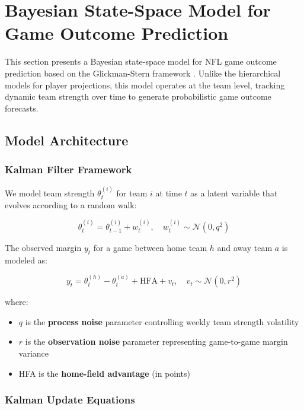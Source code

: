 \section{Bayesian State-Space Model for Game Outcome Prediction}
\label{sec:state-space-model}

This section presents a Bayesian state-space model for NFL game outcome prediction based on the Glickman-Stern framework \citep{glickman1998state}. Unlike the hierarchical models for player projections, this model operates at the team level, tracking dynamic team strength over time to generate probabilistic game outcome forecasts.

\subsection{Model Architecture}

\subsubsection{Kalman Filter Framework}

We model team strength $\theta_t^{(i)}$ for team $i$ at time $t$ as a latent variable that evolves according to a random walk:

\begin{equation}
\theta_t^{(i)} = \theta_{t-1}^{(i)} + w_t^{(i)}, \quad w_t^{(i)} \sim \mathcal{N}(0, q^2)
\label{eq:state-evolution}
\end{equation}

The observed margin $y_t$ for a game between home team $h$ and away team $a$ is modeled as:

\begin{equation}
y_t = \theta_t^{(h)} - \theta_t^{(a)} + \text{HFA} + v_t, \quad v_t \sim \mathcal{N}(0, r^2)
\label{eq:observation-model}
\end{equation}

where:
\begin{itemize}
    \item $q$ is the \textbf{process noise} parameter controlling weekly team strength volatility
    \item $r$ is the \textbf{observation noise} parameter representing game-to-game margin variance
    \item HFA is the \textbf{home-field advantage} (in points)
\end{itemize}

\subsubsection{Kalman Update Equations}

